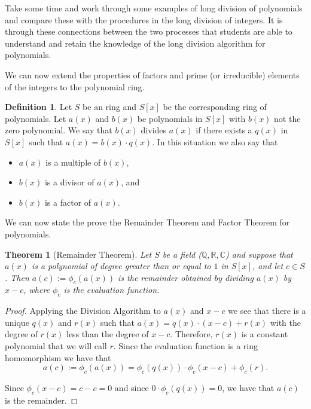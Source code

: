 \documentclass[
]{book}
\providecommand{\tightlist}{%
  \setlength{\itemsep}{0pt}\setlength{\parskip}{0pt}}
\newtheorem{theorem}{Theorem}[chapter]
\theoremstyle{definition}
\newtheorem{definition}{Definition}[chapter]
\theoremstyle{definition}
\theoremstyle{definition}
\theoremstyle{definition}
\theoremstyle{remark}
\begin{document}
Take some time and work through some examples of long division of polynomials and compare these with the procedures in the long division of integers. It is through these connections between the two processes that students are able to understand and retain the knowledge of the long division algorithm for polynomials.

We can now extend the properties of factors and prime (or irreducible) elements of the integers to the polynomial ring.

\begin{definition}

Let \(S\) be an ring and \(S[x]\) be the corresponding ring of polynomials. Let \(a(x)\) and \(b(x)\) be polynomials in \(S[x]\) with \(b(x)\) not the zero polynomial. We say that \(b(x)\) divides \(a(x)\) if there exists a \(q(x)\) in \(S[x]\) such that \(a(x)=b(x)\cdot q(x)\). In this situation we also say that

\begin{itemize}
\tightlist
\item
  \(a(x)\) is a multiple of \(b(x)\),
\item
  \(b(x)\) is a divisor of \(a(x)\), and
\item
  \(b(x)\) is a factor of \(a(x)\).
\end{itemize}

\end{definition}

We can now state the prove the Remainder Theorem and Factor Theorem for polynomials.

\begin{theorem}[Remainder Theorem]
Let \(S\) be a field (\(\mathbb{Q}, \mathbb{R}, \mathbb{C}\)) and suppose that \(a(x)\) is a polynomial of degree greater than or equal to \(1\) in \(S[x]\), and let \(c\in S\). Then \(a(c):=\phi_c(a(x))\) is the remainder obtained by dividing \(a(x)\) by \(x-c\), where \(\phi_c\) is the evaluation function.
\end{theorem}

\begin{proof}
Applying the Division Algorithm to \(a(x)\) and \(x-c\) we see that there is a unique \(q(x)\) and \(r(x)\) such that \(a(x)=q(x)\cdot (x-c)+r(x)\) with the degree of \(r(x)\) less than the degree of \(x-c\). Therefore, \(r(x)\) is a constant polynomial that we will call \(r\). Since the evaluation function is a ring homomorphism we have that \[a(c):= \phi_c(a(x))=\phi_c(q(x))\cdot \phi_c(x-c) + \phi_c(r).\]

Since \(\phi_c(x-c)=c-c=0\) and since \(0\cdot \phi_c(q(x))=0\), we have that \(a(c)\) is the remainder.
\end{proof}
\end{document}
